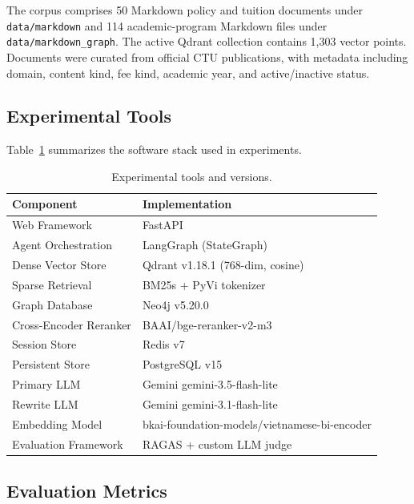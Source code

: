 \documentclass[runningheads]{llncs}
\begin{document}
The corpus comprises 50 Markdown policy and tuition documents under \texttt{data/markdown} and 114 academic-program Markdown files under \texttt{data/markdown\_graph}. The active Qdrant collection contains 1,303 vector points. Documents were curated from official CTU publications, with metadata including domain, content kind, fee kind, academic year, and active/inactive status.


\subsection{Experimental Tools}
\label{sec:tools}

Table~\ref{tab:tools} summarizes the software stack used in experiments.

\begin{table}[t]
\centering
\caption{Experimental tools and versions.}
\label{tab:tools}
\small
\begin{tabular}{@{}ll@{}}
\toprule
\textbf{Component} & \textbf{Implementation} \\
\midrule
Web Framework & FastAPI \\
Agent Orchestration & LangGraph (StateGraph) \\
Dense Vector Store & Qdrant v1.18.1 (768-dim, cosine) \\
Sparse Retrieval & BM25s + PyVi tokenizer \\
Graph Database & Neo4j v5.20.0 \\
Cross-Encoder Reranker & BAAI/bge-reranker-v2-m3 \\
Session Store & Redis v7 \\
Persistent Store & PostgreSQL v15 \\
Primary LLM & Gemini gemini-3.5-flash-lite \\
Rewrite LLM & Gemini gemini-3.1-flash-lite \\
Embedding Model & bkai-foundation-models/vietnamese-bi-encoder \\
Evaluation Framework & RAGAS + custom LLM judge \\
\bottomrule
\end{tabular}
\end{table}

\subsection{Evaluation Metrics}
\label{sec:metrics}
\end{document}
